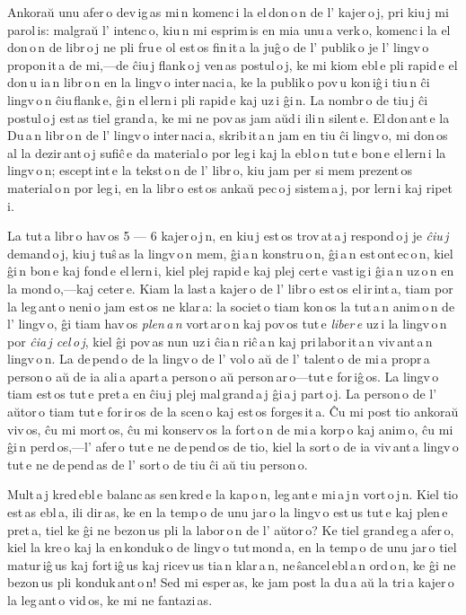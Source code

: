 Ankoraŭ unu afer\,o dev\,ig\,as mi\,n komenc\,i la el\,don\,o\,n de l' kajer\,o\,j, pri kiu\,j mi parol\,is: malgraŭ l' intenc\,o, kiu\,n mi esprim\,is en mia unu\,a verk\,o, komenc\,i la el\,don\,o\,n de libr\,o\,j ne pli fru\,e ol est\,os fin\,it\,a la juĝ\,o de l' publik\,o je l' lingv\,o propon\,it\,a de mi,---de ĉiu\,j flank\,o\,j ven\,as postul\,o\,j, ke mi kiom ebl\,e pli rapid\,e el\,don\,u ia\,n libr\,o\,n en la lingv\,o inter\,naci\,a, ke la publik\,o pov\,u kon\,iĝ\,i tiu\,n ĉi lingv\,o\,n ĉiu\,flank\,e, ĝi\,n el\,lern\,i pli rapid\,e kaj uz\,i ĝi\,n. La nombr\,o de tiu\,j ĉi postul\,o\,j est\,as tiel grand\,a, ke mi ne pov\,as jam aŭd\,i ili\,n silent\,e. El\,don\,ant\,e la \glqq{}Du\,a\,n libr\,o\,n de l' lingv\,o inter\,naci\,a\grqq{}, skrib\,it\,a\,n jam en tiu ĉi lingv\,o, mi don\,os al la dezir\,ant\,o\,j sufiĉ\,e da material\,o por leg\,i kaj la ebl\,o\,n tut\,e bon\,e el\,lern\,i la lingv\,o\,n; escept\,int\,e la tekst\,o\,n de l' libr\,o, kiu jam per si mem prezent\,os material\,o\,n por leg\,i, en la libr\,o est\,os ankaŭ pec\,o\,j sistem\,a\,j, por lern\,i kaj ripet\,i.

La tut\,a libr\,o hav\,os 5 --- 6 kajer\,o\,j\,n, en kiu\,j est\,os trov\,at\,a\,j respond\,o\,j je \emph{ĉiu\,j} demand\,o\,j, kiu\,j tuŝ\,as la lingv\,o\,n mem, ĝi\,a\,n konstru\,o\,n, ĝi\,a\,n est\,ont\,ec\,o\,n, kiel ĝi\,n bon\,e kaj fond\,e el\,lern\,i, kiel plej rapid\,e kaj plej cert\,e vast\,ig\,i ĝi\,a\,n uz\,o\,n en la mond\,o,---kaj ceter\,e. Kiam la last\,a kajer\,o de l' libr\,o est\,os el\,ir\,int\,a, tiam por la leg\,ant\,o neni\,o jam est\,os ne klar\,a: la societ\,o tiam kon\,os la tut\,a\,n anim\,o\,n de l' lingv\,o, ĝi tiam hav\,os \emph{plen\,a\,n} vort\,ar\,o\,n kaj pov\,os tut\,e \emph{liber\,e} uz\,i la lingv\,o\,n por \emph{ĉia\,j cel\,o\,j}, kiel ĝi pov\,as nun uz\,i ĉia\,n riĉ\,a\,n kaj pri\,labor\,it\,a\,n viv\,ant\,a\,n lingv\,o\,n. La de\,pend\,o de la lingv\,o de l' vol\,o aŭ de l' talent\,o de mi\,a propr\,a person\,o aŭ de ia ali\,a apart\,a person\,o aŭ person\,ar\,o---tut\,e for\,iĝ\,os. La lingv\,o tiam est\,os tut\,e pret\,a en ĉiu\,j plej mal\,grand\,a\,j ĝi\,a\,j part\,o\,j. La person\,o de l' aŭtor\,o tiam tut\,e for\,ir\,os de la scen\,o kaj est\,os forges\,it\,a. Ĉu mi post tio ankoraŭ viv\,os, ĉu mi mort\,os, ĉu mi konserv\,os la fort\,o\,n de mi\,a korp\,o kaj anim\,o, ĉu mi ĝi\,n perd\,os,---l' afer\,o tut\,e ne de\,pend\,os de tio, kiel la sort\,o de ia viv\,ant\,a lingv\,o tut\,e ne de\,pend\,as de l' sort\,o de tiu ĉi aŭ tiu person\,o.

Mult\,a\,j kred\,ebl\,e balanc\,as sen\,kred\,e la kap\,o\,n, leg\,ant\,e mi\,a\,j\,n vort\,o\,j\,n. Kiel tio est\,as ebl\,a, ili dir\,as, ke en la temp\,o de unu jar\,o la lingv\,o est\,us tut\,e kaj plen\,e pret\,a, tiel ke ĝi ne bezon\,us pli la labor\,o\,n de l' aŭtor\,o? Ke tiel grand\,eg\,a afer\,o, kiel la kre\,o kaj la en\,konduk\,o de lingv\,o tut\,mond\,a, en la temp\,o de unu jar\,o tiel matur\,iĝ\,us kaj fort\,iĝ\,us kaj ricev\,us tia\,n klar\,a\,n, ne\,ŝancel\,ebl\,a\,n ord\,o\,n, ke ĝi ne bezon\,us pli konduk\,ant\,o\,n! Sed mi esper\,as, ke jam post la du\,a aŭ la tri\,a kajer\,o la leg\,ant\,o vid\,os, ke mi ne fantazi\,as.

